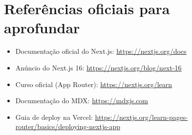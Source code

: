 \section{Referências oficiais para aprofundar}

\begin{itemize}[leftmargin=*, itemsep=0.3em]
  \item Documentação oficial do Next.js: \url{https://nextjs.org/docs}
  \item Anúncio do Next.js 16: \url{https://nextjs.org/blog/next-16}
  \item Curso oficial (App Router): \url{https://nextjs.org/learn}
  \item Documentação do MDX: \url{https://mdxjs.com}
  \item Guia de deploy na Vercel: \url{https://nextjs.org/learn-pages-router/basics/deploying-nextjs-app}
\end{itemize}

